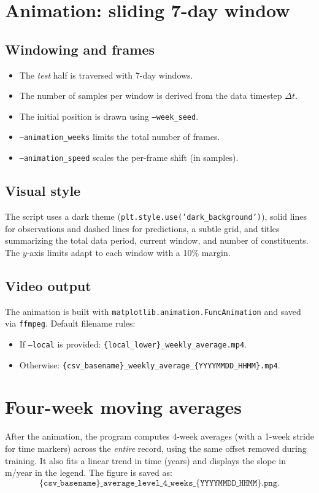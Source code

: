 \documentclass[11pt,a4paper]{article}
\begin{document}
\section{Animation: sliding 7-day window}
\subsection{Windowing and frames}
\begin{itemize}[leftmargin=1.5em]
  \item The \emph{test} half is traversed with 7-day windows.
  \item The number of samples per window is derived from the data timestep $\Delta t$.
  \item The initial position is drawn using \texttt{--week\_seed}.
  \item \texttt{--animation\_weeks} limits the total number of frames.
  \item \texttt{--animation\_speed} scales the per-frame shift (in samples).
\end{itemize}

\subsection{Visual style}
The script uses a dark theme (\texttt{plt.style.use('dark\_background')}), solid lines for observations and dashed lines for predictions, a subtle grid, and titles summarizing the total data period, current window, and number of constituents. The $y$-axis limits adapt to each window with a 10\% margin.

\subsection{Video output}
The animation is built with \texttt{matplotlib.animation.FuncAnimation} and saved via \texttt{ffmpeg}. Default filename rules:
\begin{itemize}[leftmargin=1.5em]
  \item If \texttt{--local} is provided: \texttt{\{local\_lower\}\_weekly\_average.mp4}.
  \item Otherwise: \texttt{\{csv\_basename\}\_weekly\_average\_\{YYYYMMDD\_HHMM\}.mp4}.
\end{itemize}

\section{Four-week moving averages}
After the animation, the program computes 4-week averages (with a 1-week stride for time markers) across the \emph{entire} record, using the same offset removed during training. It also fits a linear trend in time (years) and displays the slope in m/year in the legend. The figure is saved as:
\[
\texttt{\{csv\_basename\}\_average\_level\_4\_weeks\_\{YYYYMMDD\_HHMM\}.png}.
\]
\end{document}

